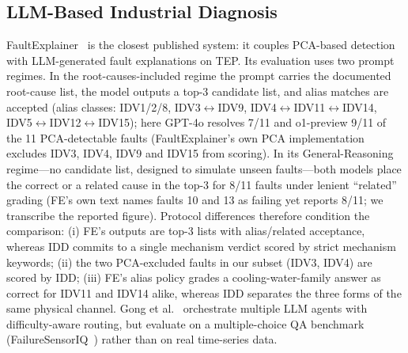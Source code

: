 \documentclass[preprint,10pt]{elsarticle}
\begin{document}
\subsection{LLM-Based Industrial Diagnosis}
FaultExplainer~\cite{khan2024faultexplainer} is the closest published system: it couples PCA-based detection with LLM-generated fault explanations on TEP. Its evaluation uses two prompt regimes. In the root-causes-included regime the prompt carries the documented root-cause list, the model outputs a top-3 candidate list, and alias matches are accepted (alias classes: IDV1/2/8, IDV3$\leftrightarrow$IDV9, IDV4$\leftrightarrow$IDV11$\leftrightarrow$IDV14, IDV5$\leftrightarrow$IDV12$\leftrightarrow$IDV15); here GPT-4o resolves 7/11 and o1-preview 9/11 of the 11 PCA-detectable faults (FaultExplainer's own PCA implementation excludes IDV3, IDV4, IDV9 and IDV15 from scoring). In its General-Reasoning regime---no candidate list, designed to simulate unseen faults---both models place the correct or a related cause in the top-3 for 8/11 faults under lenient ``related'' grading (FE's own text names faults 10 and 13 as failing yet reports 8/11; we transcribe the reported figure). Protocol differences therefore condition the comparison: (i) FE's outputs are top-3 lists with alias/related acceptance, whereas IDD commits to a single mechanism verdict scored by strict mechanism keywords; (ii) the two PCA-excluded faults in our subset (IDV3, IDV4) are scored by IDD; (iii) FE's alias policy grades a cooling-water-family answer as correct for IDV11 and IDV14 alike, whereas IDD separates the three forms of the same physical channel. Gong et al.~\cite{gong2026harnessing} orchestrate multiple LLM agents with difficulty-aware routing, but evaluate on a multiple-choice QA benchmark (FailureSensorIQ~\cite{constantinides2025failuresensoriq}) rather than on real time-series data.
\end{document}
